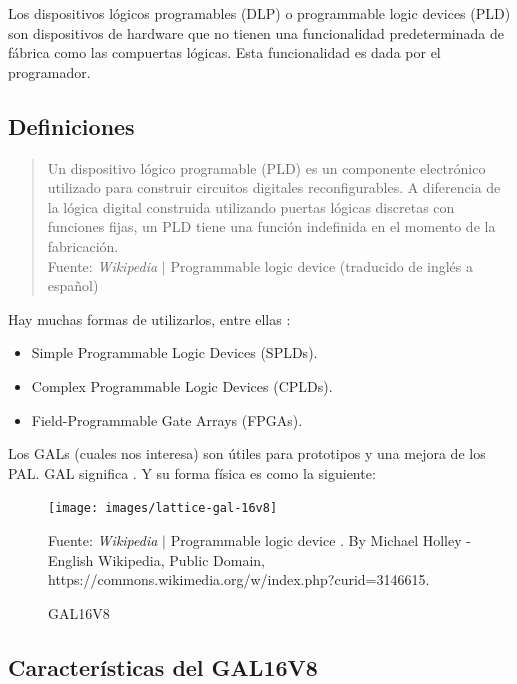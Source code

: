 \documentclass{article}
\begin{document}
    Los dispositivos lógicos programables (DLP) o programmable logic devices (PLD) son dispositivos de hardware que no tienen una funcionalidad predeterminada de fábrica como las compuertas lógicas. Esta funcionalidad es dada por el programador.

    \subsection{Definiciones}

    \begin{quote}
        Un dispositivo lógico programable (PLD) es un componente electrónico utilizado para construir circuitos digitales reconfigurables. A diferencia de la lógica digital construida utilizando puertas lógicas discretas con funciones fijas, un PLD tiene una función indefinida en el momento de la fabricación.\\ \footnotesize
        Fuente: \textit{Wikipedia} $\mid$ Programmable logic device \cite{wikipedia-pld-2022} (traducido de inglés a español)
    \end{quote}

    Hay muchas formas de utilizarlos, entre ellas \cite{wikipedia-pld-2022}:

    \begin{itemize}
        \item Simple Programmable Logic Devices (SPLDs).
        \item Complex Programmable Logic Devices (CPLDs).
        \item Field-Programmable Gate Arrays (FPGAs).
    \end{itemize}

    Los GALs (cuales nos interesa) son útiles para prototipos y una mejora de los PAL. GAL significa . Y su forma física es como la siguiente:

    \begin{figure}[H]
        \centering
        \texttt{[image: images/lattice-gal-16v8]}
        \caption{GAL16V8}\footnotesize
        Fuente: \textit{Wikipedia} $\mid$  Programmable logic device \cite{wikipedia-pld-2022}. By Michael Holley - English Wikipedia, Public Domain, https://commons.wikimedia.org/w/index.php?curid=3146615.
    \end{figure}

    \subsection{Características del GAL16V8}
\end{document}
